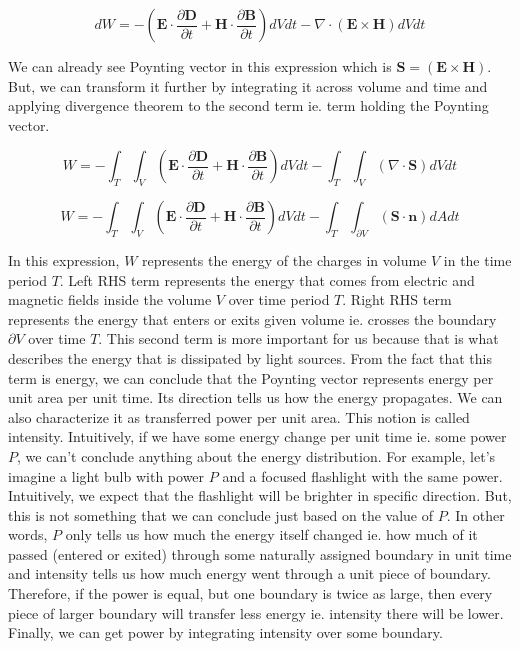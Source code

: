 \documentclass{article}
\begin{document}
\[ dW = -(\mathbf{E} \cdot \frac{\partial \mathbf{D}}{\partial t} + \mathbf{H} \cdot \frac{\partial \mathbf{B}}{\partial t})dVdt - \nabla \cdot (\mathbf{E} \times \mathbf{H})dVdt \]

We can already see Poynting vector in this expression which is $\mathbf{S} = (\mathbf{E} \times \mathbf{H})$. But, we can transform it further by integrating it across volume and time and applying divergence theorem to the second term ie. term holding the Poynting vector.

\[ W = -\int_{T}\int_{V}(\mathbf{E} \cdot \frac{\partial \mathbf{D}}{\partial t} + \mathbf{H} \cdot \frac{\partial \mathbf{B}}{\partial t})dVdt - \int_{T}\int_{V}(\nabla \cdot \mathbf{S}) dVdt \]

\[ W = -\int_{T}\int_{V}(\mathbf{E} \cdot \frac{\partial \mathbf{D}}{\partial t} + \mathbf{H} \cdot \frac{\partial \mathbf{B}}{\partial t})dVdt - \int_{T}\int_{\partial V}(\mathbf{S} \cdot \mathbf{n} )dAdt \]

In this expression, $W$ represents the energy of the charges in volume $V$ in the time period $T$. Left RHS term represents the energy that comes from electric and magnetic fields inside the volume $V$ over time period $T$. Right RHS term represents the energy that enters or exits given volume ie. crosses the boundary $\partial V$ over time $T$. This second term is more important for us because that is what describes the energy that is dissipated by light sources. From the fact that this term is energy, we can conclude that the Poynting vector represents energy per unit area per unit time. Its direction tells us how the energy propagates. We can also characterize it as transferred power per unit area. This notion is called intensity. Intuitively, if we have some energy change per unit time ie. some power $P$, we can't conclude anything about the energy distribution. For example, let's imagine a light bulb with power $P$ and a focused flashlight with the same power. Intuitively, we expect that the flashlight will be brighter in specific direction. But, this is not something that we can conclude just based on the value of $P$. In other words, $P$ only tells us how much the energy itself changed ie. how much of it passed (entered or exited) through some naturally assigned boundary in unit time and intensity tells us how much energy went through a unit piece of boundary. Therefore, if the power is equal, but one boundary is twice as large, then every piece of larger boundary will transfer less energy ie. intensity there will be lower. Finally, we can get power by integrating intensity over some boundary.
\end{document}
